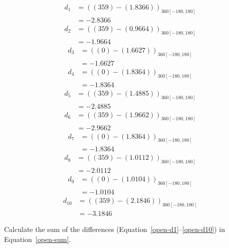 \documentclass[twocolumn]{article}
\begin{document}
\begin{align}
d_{1} &= ((359) - (1.8366))_{360[-180,180]} \nonumber\\
 &= -2.8366 \label{open-d1}
\end{align}
\begin{align}
d_{2} &= ((359) - (0.9664))_{360[-180,180]} \nonumber\\
 &= -1.9664 \label{open-d2}
\end{align}
\begin{align}
d_{3} &= ((0) - (1.6627))_{360[-180,180]} \nonumber\\
 &= -1.6627 \label{open-d3}
\end{align}
\begin{align}
d_{4} &= ((0) - (1.8364))_{360[-180,180]} \nonumber\\
 &= -1.8364 \label{open-d4}
\end{align}
\begin{align}
d_{5} &= ((359) - (1.4885))_{360[-180,180]} \nonumber\\
 &= -2.4885 \label{open-d5}
\end{align}
\begin{align}
d_{6} &= ((359) - (1.9662))_{360[-180,180]} \nonumber\\
 &= -2.9662 \label{open-d6}
\end{align}
\begin{align}
d_{7} &= ((0) - (1.8364))_{360[-180,180]} \nonumber\\
 &= -1.8364 \label{open-d7}
\end{align}
\begin{align}
d_{8} &= ((359) - (1.0112))_{360[-180,180]} \nonumber\\
 &= -2.0112 \label{open-d8}
\end{align}
\begin{align}
d_{9} &= ((0) - (1.0104))_{360[-180,180]} \nonumber\\
 &= -1.0104 \label{open-d9}
\end{align}
\begin{align}
d_{10} &= ((359) - (2.1846))_{360[-180,180]} \nonumber\\
 &= -3.1846 \label{open-d10}
\end{align}

Calculate the sum of the differences (Equation~\ref{open-d1}--\ref{open-d10}) in Equation~\ref{open-sum}.
\end{document}
